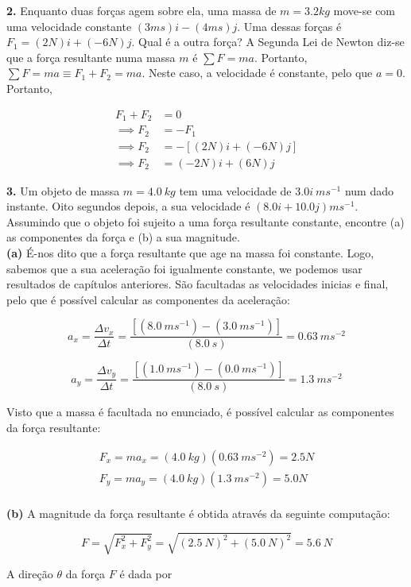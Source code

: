 \textbf{2.} Enquanto duas forças agem sobre ela, uma massa de $m=3.2kg$ move-se com uma velocidade constante $(3ms)i-(4ms)j$. Uma dessas forças é $F_1=(2N)i+(-6N)j$. Qual é a outra força?
\linebreak
A Segunda Lei de Newton diz-se que a força resultante numa massa $m$ é $\sum F = ma$. Portanto, $\sum F = ma \equiv F_1+F_2=ma$. Neste caso, a velocidade é constante, pelo que $a=0$. Portanto,

$$
\begin{aligned}
    F_1+F_2&=0 \\
    \implies F_2&=-F_1 \\
    \implies F_2&=-[(2N)i+(-6N)j] \\
    \implies F_2&=(-2N)i+(6N)j
\end{aligned}
$$

\textbf{3.} Um objeto de massa $m=4.0\ kg$ tem uma velocidade de $3.0i\ ms^{-1}$ num dado instante. Oito segundos depois, a sua velocidade é $(8.0i+10.0j)ms^{-1}$. Assumindo que o objeto foi sujeito a uma força resultante constante, encontre (a) as componentes da força e (b) a sua magnitude. \\
\linebreak
\textbf{(a)} É-nos dito que a força resultante que age na massa foi constante. Logo, sabemos que a sua aceleração foi igualmente constante, we podemos usar resultados de capítulos anteriores. São facultadas as velocidades inicias e final, pelo que é possível calcular as componentes da aceleração:

$$
a_x=\frac{\Delta v_x}{\Delta t}=\frac{[(8.0\ ms^{-1})-(3.0\ ms^{-1})]}{(8.0\ s)}=0.63\ ms^{-2}
$$

$$
a_y=\frac{\Delta v_y}{\Delta t}=\frac{[(1.0\ ms^{-1})-(0.0\ ms^{-1})]}{(8.0\ s)}=1.3\ ms^{-2}
$$

Visto que a massa é facultada no enunciado, é possível calcular as componentes da força resultante:

$$
\begin{aligned}
    F_x=ma_x=(4.0\ kg)(0.63\ ms^{-2})=2.5N \\
    F_y=ma_y=(4.0\ kg)(1.3\ ms^{-2})=5.0N \\
\end{aligned}
$$

\textbf{(b)} A magnitude da força resultante é obtida através da seguinte computação:

$$
F=\sqrt{F_x^2+F_y^2}=\sqrt{(2.5\ N)^2+(5.0\ N)^2}=5.6\ N
$$

A direção $\theta$ da força $F$ é dada por

